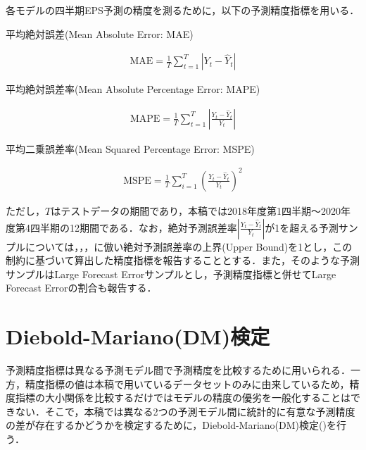 \documentclass[a4paper，12pt]{jsarticle}
\begin{document}
各モデルの四半期EPS予測の精度を測るために，以下の予測精度指標を用いる．

平均絶対誤差(Mean Absolute Error: MAE)

\begin{equation}
  \begin{split}
    \text{MAE} = \frac {1} {T} \sum^{T}_{t=1}\left| Y_t - \hat{Y}_t \right|
  \end{split}
\end{equation}

平均絶対誤差率(Mean Absolute Percentage Error: MAPE)

\begin{equation}
  \begin{split}
    \text{MAPE} = \frac {1} {T} \sum^{T}_{t=1}\left| \frac {Y_t - \hat{Y}_t} {Y_t} \right|
  \end{split}
\end{equation}

平均二乗誤差率(Mean Squared Percentage Error: MSPE)

\begin{equation}
  \begin{split}
    \text{MSPE} = \frac {1} {T} \sum^{T}_{i=1} \left( \frac {Y_t - \hat{Y}_t} {Y_t} \right) ^2
  \end{split}
\end{equation}

ただし，$T$はテストデータの期間であり，本稿では2018年度第1四半期～2020年度第4四半期の12期間である．なお，絶対予測誤差率$ \left| \frac{Y_t -{\hat Y}_t}{Y_t} \right|$が1を超える予測サンプルについては，\cite*{brown1979univariate}，\cite*{lorek1996multivariate}，\cite{zhang2004neural}に倣い絶対予測誤差率の上界(Upper Bound)を1とし，この制約に基づいて算出した精度指標を報告することとする．また，そのような予測サンプルはLarge Forecast Errorサンプルとし，予測精度指標と併せてLarge Forecast Errorの割合も報告する．

\section{Diebold-Mariano(DM)検定}

予測精度指標は異なる予測モデル間で予測精度を比較するために用いられる．一方，精度指標の値は本稿で用いているデータセットのみに由来しているため，精度指標の大小関係を比較するだけではモデルの精度の優劣を一般化することはできない．そこで，本稿では異なる2つの予測モデル間に統計的に有意な予測精度の差が存在するかどうかを検定するために，Diebold-Mariano(DM)検定(\cite*{diebold2002comparing})を行う．
\end{document}
